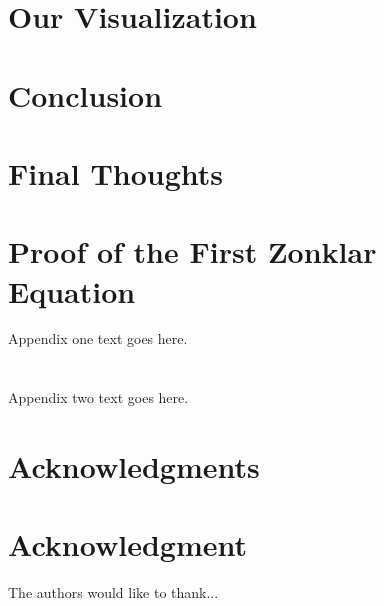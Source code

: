 \documentclass[10pt,journal,compsoc]{IEEEtran}
\begin{document}
\section{Our Visualization}

\section{Conclusion}


\section{Final Thoughts}


\appendices
\section{Proof of the First Zonklar Equation}
Appendix one text goes here.

\section{}
Appendix two text goes here.


\ifCLASSOPTIONcompsoc
  \section*{Acknowledgments}
\else
  \section*{Acknowledgment}
\fi


The authors would like to thank...


\ifCLASSOPTIONcaptionsoff
  \newpage
\fi




\end{document}
